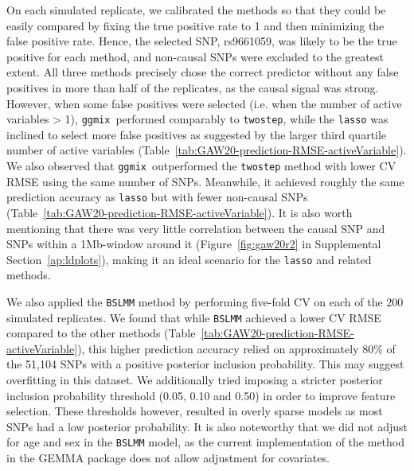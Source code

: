 \documentclass[10pt,letterpaper]{article}
\newcommand{\ggmix}{\texttt{ggmix}}
\begin{document}
On each simulated replicate, we calibrated the methods so that they could be easily compared by fixing the true positive rate to 1 and then minimizing the false positive rate. Hence, the selected SNP, rs9661059, was likely to be the true positive for each method, and non-causal SNPs were excluded to the greatest extent.
All three methods precisely chose the correct predictor without any false positives in more than half of the replicates, as the causal signal was strong. However, when some false positives were selected (i.e. when the number of active variables > 1), \ggmix ~performed comparably to \texttt{twostep}, while the \texttt{lasso} was inclined to select more false positives as suggested by the larger third quartile number of active variables (Table~\ref{tab:GAW20-prediction-RMSE-activeVariable}).
We also observed that \ggmix ~outperformed the \texttt{twostep} method with lower CV RMSE using the same number of SNPs. Meanwhile, it achieved roughly the same prediction accuracy as \texttt{lasso} but with fewer non-causal SNPs (Table~\ref{tab:GAW20-prediction-RMSE-activeVariable}). It is also worth mentioning that there was very little correlation between the causal SNP and SNPs within a 1Mb-window around it (Figure~\ref{fig:gaw20r2} in Supplemental Section~\ref{ap:ldplots}), making it an ideal scenario for the \texttt{lasso} and related methods.


We also applied the \texttt{BSLMM} method by performing five-fold CV on each of the 200 simulated replicates. 
We found that while \texttt{BSLMM} achieved a lower CV RMSE compared to the other methods (Table~\ref{tab:GAW20-prediction-RMSE-activeVariable}), this higher prediction accuracy relied on approximately 80\% of the 51,104 SNPs with a positive posterior inclusion probability. 
This may suggest overfitting in this dataset. 
We additionally tried imposing a stricter posterior inclusion probability threshold (0.05, 0.10 and 0.50) in order to improve feature selection. These thresholds however, resulted in overly sparse models as most SNPs had a low posterior probability.
It is also noteworthy that we did not adjust for age and sex in the \texttt{BSLMM} model, as the current implementation of the method in the GEMMA package does not allow adjustment for covariates.


\end{document}
